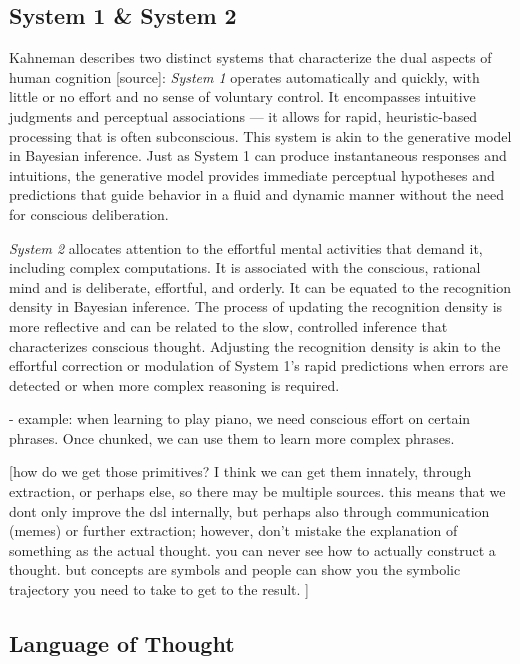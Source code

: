 \subsection{System 1 \& System 2}

Kahneman describes two distinct systems that characterize the dual aspects of human cognition [source]:
\emph{System 1} operates automatically and quickly, with little or no effort and no sense of voluntary control. It encompasses intuitive judgments and perceptual associations — it allows for rapid, heuristic-based processing that is often subconscious.
This system is akin to the generative model in Bayesian inference. Just as System 1 can produce instantaneous responses and intuitions, the generative model provides immediate perceptual hypotheses and predictions that guide behavior in a fluid and dynamic manner without the need for conscious deliberation.

\emph{System 2} allocates attention to the effortful mental activities that demand it, including complex computations. It is associated with the conscious, rational mind and is deliberate, effortful, and orderly. It can be equated to the recognition density in Bayesian inference. The process of updating the recognition density is more reflective and can be related to the slow, controlled inference that characterizes conscious thought. Adjusting the recognition density is akin to the effortful correction or modulation of System 1's rapid predictions when errors are detected or when more complex reasoning is required.

- example: when learning to play piano, we need conscious effort on certain phrases. Once chunked, we can use them to learn more complex phrases.


\cite{Lake_Ullman_Tenenbaum_Gershman_2017}


[how do we get those primitives? I think we can get them innately, through extraction, or perhaps else, so there may be multiple sources. this means that we dont only improve the dsl internally, but perhaps also through communication (memes) or further extraction; however, don't mistake the explanation of something as the actual thought. you can never see how to actually construct a thought. but concepts are symbols and people can show you the symbolic trajectory you need to take to get to the result. ]








\subsection{Language of Thought}

